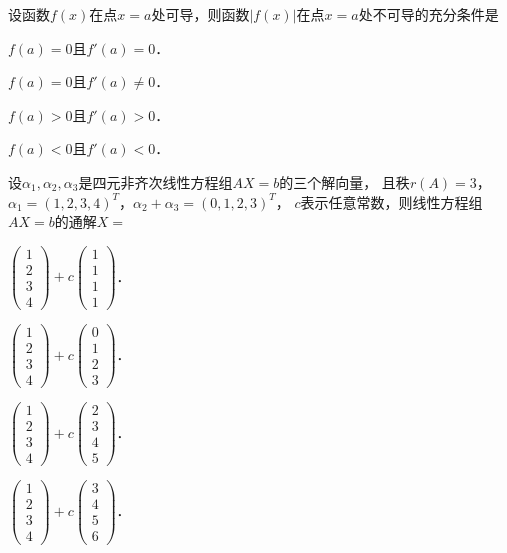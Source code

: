 \documentclass[plain,noanswer,medmath]{../../template/jnuexam}
\begin{document}
\begin{problem}
设函数$f(x)$在点$x = a$处可导，则函数$\left| f(x) \right|$在点$x = a$处不可导的充分条件是\pickout{}
\begin{abcd}
\item $f(a) = 0$且$f'(a) = 0$．
\item $f(a) = 0$且$f'(a) \ne 0$．
\item $f(a) > 0$且$f'(a) > 0$．
\item $f(a) < 0$且$f'(a) < 0$．
\end{abcd}
\end{problem}


\begin{problem}
设$\alpha_1,\alpha_2,\alpha_3$是四元非齐次线性方程组$AX = b$的三个解向量，
且秩$r(A) = 3$，$\alpha_1 = \left(1,2,3,4 \right)^T$，$\alpha_2 + \alpha_3 = \left(0,1,2,3 \right)^T$，
$c$表示任意常数，则线性方程组$AX = b$的通解$X =$\pickout{}
\begin{abcd}
\item $\begin{pmatrix}
  1 \\
  2 \\
  3 \\
  4
\end{pmatrix} + c\begin{pmatrix}
  1 \\
  1 \\
  1 \\
  1
\end{pmatrix}$．
\item $\begin{pmatrix}
  1 \\
  2 \\
  3 \\
  4
\end{pmatrix} + c\begin{pmatrix}
  0 \\
  1 \\
  2 \\
  3
\end{pmatrix}$．
\item $\begin{pmatrix}
  1 \\
  2 \\
  3 \\
  4
\end{pmatrix} + c\begin{pmatrix}
  2 \\
  3 \\
  4 \\
  5
\end{pmatrix}$．
\item $\begin{pmatrix}
  1 \\
  2 \\
  3 \\
  4
\end{pmatrix} + c\begin{pmatrix}
  3 \\
  4 \\
  5 \\
  6
\end{pmatrix}$．
\end{abcd}
\end{problem}
\end{document}
